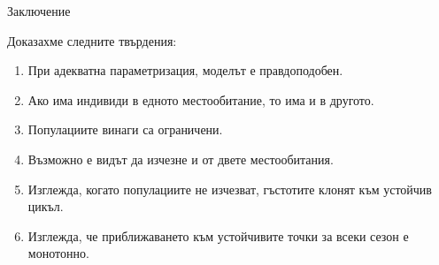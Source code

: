 \begin{frame}[t]{Заключение}

Доказахме следните твърдения:
\begin{enumerate}
\item При адекватна параметризация, моделът е правдоподобен.
\item Ако има индивиди в едното местообитание, то има и в другото.
\item Популациите винаги са ограничени.
\item Възможно е видът да изчезне и от двете местообитания.
\item Изглежда, когато популациите не изчезват, гъстотите клонят към устойчив цикъл.
\item Изглежда, че приближаването към устойчивите точки за всеки сезон е монотонно.

\end{enumerate}

\end{frame}